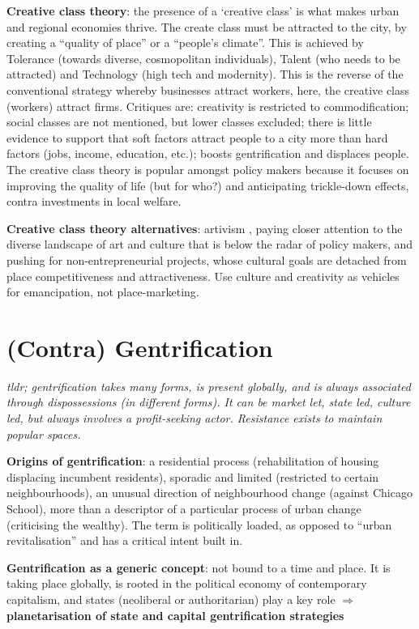 \documentclass{article}
\newcommand{\alignedmarginpar}[1]{%
        \marginpar{\raggedright\small #1}
    }
\begin{document}
\textbf{Creative class theory}: the presence of a `creative class' is what makes urban and regional economies thrive. The create class must be attracted to the city, by creating a ``quality of place'' or a ``people's climate''. This is achieved by Tolerance (towards diverse, cosmopolitan individuals), Talent (who needs to be attracted) and Technology (high tech and modernity). This is the reverse of the conventional strategy whereby businesses attract workers, here, the creative class (workers) attract firms. Critiques are: creativity is restricted to commodification; social classes are not mentioned, but lower classes excluded; there is little evidence to support that soft factors attract people to a city more than hard factors (jobs, income, education, etc.); boosts gentrification and displaces people. The creative class theory is popular amongst policy makers because it focuses on improving the quality of life (but for who?) and anticipating trickle-down effects, contra investments in local welfare.

\textbf{Creative class theory alternatives}: artivism \alignedmarginpar{Hamburg}, paying closer attention to the diverse landscape of art and culture that is below the radar of policy makers, and pushing for non-entrepreneurial projects, whose cultural goals are detached from place competitiveness and attractiveness. Use culture and creativity as vehicles for emancipation, not place-marketing.

\pagebreak
\section{(Contra) Gentrification}

\textit{tldr; gentrification takes many forms, is present globally, and is always associated through dispossessions (in different forms). It can be market let, state led, culture led, but always involves a profit-seeking actor. Resistance exists to maintain popular spaces.}

\textbf{Origins of gentrification}: \alignedmarginpar{Ruth Glass, 1964} a residential process (rehabilitation of housing displacing incumbent residents), sporadic and limited (restricted to certain neighbourhoods), an unusual direction of neighbourhood change (against Chicago School), more than a descriptor of a particular process of urban change (criticising the wealthy). The term is politically loaded, as opposed to ``urban revitalisation'' and has a critical intent built in.

\textbf{Gentrification as a generic concept}: not bound to a time and place. It is taking place globally, is rooted in the political economy of contemporary capitalism, and states (neoliberal or authoritarian) play a key role $\Rightarrow$ \textbf{planetarisation of state and capital gentrification strategies}
\end{document}
